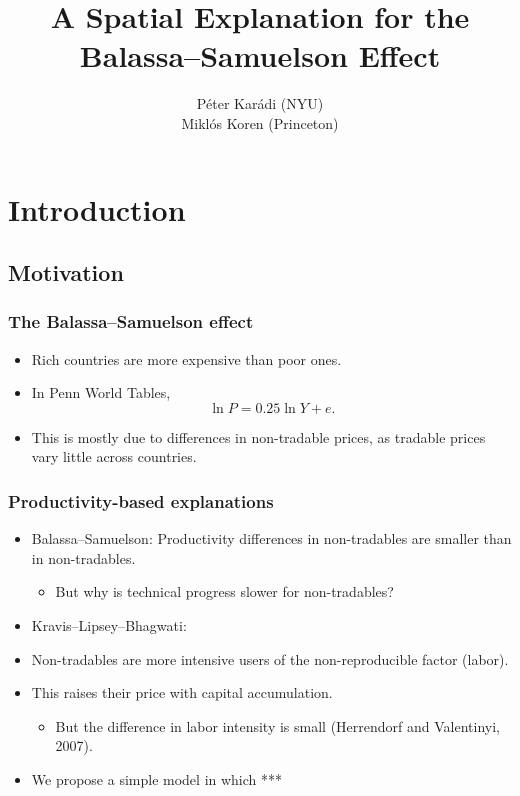 \documentclass[handout,compress,mathserif]{beamer}
\title[Balassa--Samuelson]%
{A Spatial Explanation for the Balassa--Samuelson Effect}
\author[Kar\'adi and Koren] %
{P\'eter Kar\'adi (NYU)\\
Mikl\'os Koren (Princeton)}
\date %
{}
\begin{document}
\begin{frame}[plain]
  \titlepage
    \addtocounter{framenumber}{-1}
\end{frame}


\section{Introduction}
\subsection{Motivation}
\begin{frame}\frametitle{The Balassa--Samuelson effect}

\begin{itemize}
    \item Rich countries are more expensive than poor ones.
    \item In Penn World Tables,
    \[
    \ln P = 0.25\ln Y + e.
    \]
    \item This is mostly due to differences in non-tradable prices, as tradable prices vary little across countries.
\end{itemize}
\end{frame}


\begin{frame}\frametitle{Productivity-based explanations}

\begin{itemize}
    \item Balassa--Samuelson: Productivity differences in non-tradables are smaller than in non-tradables.
        \begin{itemize}
            \item But why is technical progress slower for non-tradables?
        \end{itemize}
    \item Kravis--Lipsey--Bhagwati:
    \item Non-tradables are more intensive users of the non-reproducible factor (labor).
    \item This raises their price with capital accumulation.
        \begin{itemize}
            \item But the difference in labor intensity is small (Herrendorf and Valentinyi, 2007).
        \end{itemize}
    \item We propose a simple model in which ***
\end{itemize}
\end{frame}
\end{document}
